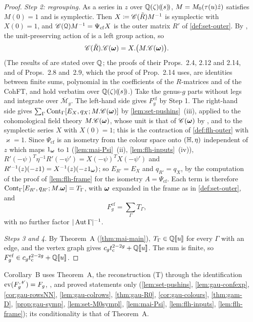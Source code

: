 \begin{proof}
\emph{Step 2: regrouping.} As a series in $z$ over $\mathbb{Q}(\zeta)(\!(s)\!)$, $M=M_{0}(\tau(u)\hat{z})$ satisfies $M(0)=1$ and is symplectic. Then $X\coloneqq\mathscr{C}(\tilde R)M^{-1}$ is symplectic with $X(0)=1$, and $\mathscr{C}(\mathcal{Q})M^{-1}=\Psi_{\mathrm{cf}}X$ is the outer matrix $R'$ of \cref{def:set-outer}. By \cite[Prop.~2.14]{PPZ15}, the unit-preserving action of \cite[Def.~2.13]{PPZ15} is a left group action, so
\[
\mathscr{C}(\tilde R).\mathscr{C}(\boldsymbol{\omega})=X.\bigl(M.\mathscr{C}(\boldsymbol{\omega})\bigr).
\]
(The results of \cite{PPZ15} are stated over $\mathbb{Q}$; the proofs of their Props.~2.4, 2.12 and 2.14, and of Props.~2.8 and~2.9, which the proof of Prop.~2.14 uses, are identities between finite sums, polynomial in the coefficients of the $R$-matrices and of the CohFT, and hold verbatim over $\mathbb{Q}(\zeta)(\!(s)\!)$.) Take the genus-$g$ parts without legs and integrate over $\overline{\mathcal M}_g$. The left-hand side gives $F_g^{\mathrm{cf}}$ by Step 1. The right-hand side gives $\sum_\Gamma\mathrm{Cont}_\Gamma[E_X,q_X;M.\mathscr{C}(\boldsymbol{\omega})]$ by \cref{lem:set-pushins}~(iii), applied to the cohomological field theory $M.\mathscr{C}(\boldsymbol{\omega})$, whose unit is that of $\mathscr{C}(\boldsymbol{\omega})$ by \cite[Prop.~2.12]{PPZ15}, and to the symplectic series $X$ with $X(0)=1$; this is the contraction of \cref{def:flh-outer} with $\varkappa=1$. Since $\Psi_{\mathrm{cf}}$ is an isometry from the colour space onto $(\mathbb{H},\eta)$ independent of $z$ which maps $1_{\boldsymbol{\omega}}$ to $1$ (\cref{lem:mai-Psi}~(ii), \cref{lem:flh-inputs}~(iv)), $R'(-\psi)^T\eta^{-1}R'(-\psi')=X(-\psi)^TX(-\psi')$ and $R'^{-1}(z)(-z1)=X^{-1}(z)(-z1_{\boldsymbol{\omega}})$; so $E_{R'}=E_X$ and $q_{R'}=q_X$, by the computation of the proof of \cref{lem:flh-frame} for the isometry $A=\Psi_{\mathrm{cf}}$. Each term is therefore $\mathrm{Cont}_\Gamma[E_{R'},q_{R'};M.\boldsymbol{\omega}]=T_\Gamma$, with $\boldsymbol{\omega}$ expanded in the frame as in \cref{def:set-outer}, and
\[
F_g^{\mathrm{cf}}=\sum_\Gamma T_\Gamma ,
\]
with no further factor $|\operatorname{Aut}\Gamma|^{-1}$.

\emph{Steps 3 and 4.} By Theorem~A (\cref{thm:mai-main}), $T_\Gamma\in\mathbb{Q}[\![ u ]\!]$ for every $\Gamma$ with an edge, and the vertex graph gives $c_gt_{\mathrm{c}}^{2-2g}+\mathbb{Q}[\![ u ]\!]$. The sum is finite, so $F_g^{\mathrm{cf}}\in c_gt_{\mathrm{c}}^{2-2g}+\mathbb{Q}[\![ u ]\!]$.
\end{proof}

Corollary~B uses Theorem~A, the reconstruction (T) through the identification $\operatorname{ev}(F_g^{\mathscr{N}})=F_g$, \cite[\S0.2, (1); Def.~0.3; (5); Rem.~2.1; Defs.~2.2 and~2.5, with the conventions stated after them; (8); Prop.~2.12; Def.~2.13; Prop.~2.14, with Props.~2.4, 2.8 and~2.9 through its proof]{PPZ15}, and proved statements only (\cref{lem:set-pushins}, \cref{lem:gau-confexp}, \cref{cor:gau-rowsNN}, \cref{lem:gau-colrows}, \cref{thm:gau-R0}, \cref{cor:gau-colours}, \cref{thm:gam-D}, \cref{prop:gau-symp}, \cref{lem:set-M0sympl}, \cref{lem:mai-Psi}, \cref{lem:flh-inputs}, \cref{lem:flh-frame}); its conditionality is that of Theorem~A.

